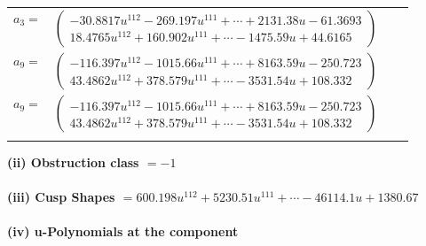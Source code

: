 \documentclass[1p]{elsarticle_modified}
\theoremstyle{definition}
\begin{document}
\begin{tabular}{m{7pt} m{180pt} m{7pt} m{180pt} }
\flushright $a_{3}=$&$\begin{pmatrix}-30.8817 u^{112}-269.197 u^{111}+\cdots+2131.38 u-61.3693\\18.4765 u^{112}+160.902 u^{111}+\cdots-1475.59 u+44.6165\end{pmatrix}$ \\
\flushright $a_{9}=$&$\begin{pmatrix}-116.397 u^{112}-1015.66 u^{111}+\cdots+8163.59 u-250.723\\43.4862 u^{112}+378.579 u^{111}+\cdots-3531.54 u+108.332\end{pmatrix}$\\ \flushright $a_{9}=$&$\begin{pmatrix}-116.397 u^{112}-1015.66 u^{111}+\cdots+8163.59 u-250.723\\43.4862 u^{112}+378.579 u^{111}+\cdots-3531.54 u+108.332\end{pmatrix}$\\&\end{tabular}
\flushleft \textbf{(ii) Obstruction class $= -1$}\\~\\
\flushleft \textbf{(iii) Cusp Shapes $= 600.198 u^{112}+5230.51 u^{111}+\cdots-46114.1 u+1380.67$}\\~\\
\newpage\renewcommand{\arraystretch}{1}
\flushleft \textbf{(iv) u-Polynomials at the component}\newline \\
\end{document}
